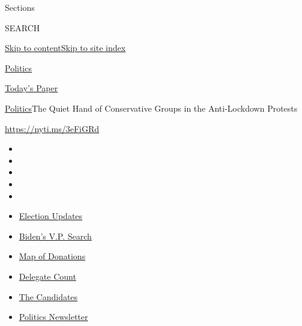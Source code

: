 Sections

SEARCH

\protect\hyperlink{site-content}{Skip to
content}\protect\hyperlink{site-index}{Skip to site index}

\href{https://www.nytimes.com/section/politics}{Politics}

\href{https://myaccount.nytimes.com/auth/login?response_type=cookie\&client_id=vi}{}

\href{https://www.nytimes.com/section/todayspaper}{Today's Paper}

\href{/section/politics}{Politics}\textbar{}The Quiet Hand of
Conservative Groups in the Anti-Lockdown Protests

\url{https://nyti.ms/3eFiGRd}

\begin{itemize}
\item
\item
\item
\item
\item
\end{itemize}

\begin{itemize}
\item
  \href{https://www.nytimes.com/2020/07/31/us/elections/biden-vs-trump.html?action=click\&pgtype=Article\&state=default\&region=TOP_BANNER\&context=storylines_menu}{Election
  Updates}
\item
  \href{https://www.nytimes.com/article/biden-vice-president-2020.html?action=click\&pgtype=Article\&state=default\&region=TOP_BANNER\&context=storylines_menu}{Biden's
  V.P. Search}
\item
  \href{https://www.nytimes.com/interactive/2020/07/24/us/politics/trump-biden-campaign-donors.html?action=click\&pgtype=Article\&state=default\&region=TOP_BANNER\&context=storylines_menu}{Map
  of Donations}
\item
  \href{https://www.nytimes.com/interactive/2020/us/elections/delegate-count-primary-results.html?action=click\&pgtype=Article\&state=default\&region=TOP_BANNER\&context=storylines_menu}{Delegate
  Count}
\item
  \href{https://www.nytimes.com/interactive/2019/us/politics/2020-presidential-candidates.html?action=click\&pgtype=Article\&state=default\&region=TOP_BANNER\&context=storylines_menu}{The
  Candidates}
\item
  \href{https://www.nytimes.com/newsletters/politics?action=click\&pgtype=Article\&state=default\&region=TOP_BANNER\&context=storylines_menu}{Politics
  Newsletter}
\end{itemize}

